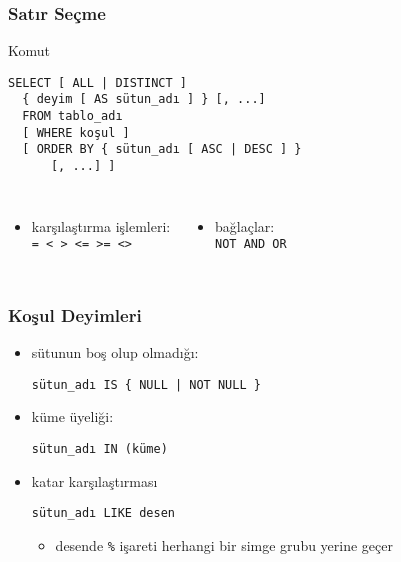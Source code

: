 \documentclass[dvipsnames]{beamer}
\theoremstyle{definition}
\theoremstyle{example}
\theoremstyle{plain}
\begin{document}
\begin{frame}[fragile]
  \frametitle{Satır Seçme}

  \begin{block}{Komut}
    \begin{lstlisting}
SELECT [ ALL | DISTINCT ]
  { deyim [ AS sütun_adı ] } [, ...]
  FROM tablo_adı
  [ WHERE koşul ]
  [ ORDER BY { sütun_adı [ ASC | DESC ] }
      [, ...] ]
    \end{lstlisting}
  \end{block}

  \pause
  \begin{columns}
    \begin{itemize}
      \item karşılaştırma işlemleri:\\
        \lstinline!= < > <= >= <>!
    \end{itemize}

    \begin{itemize}
      \item bağlaçlar:\\
        \lstinline!NOT AND OR!
    \end{itemize}
  \end{columns}
\end{frame}

\begin{frame}[fragile]
  \frametitle{Koşul Deyimleri}

  \begin{itemize}
    \item sütunun boş olup olmadığı:\\
    \begin{lstlisting}
sütun_adı IS { NULL | NOT NULL }
    \end{lstlisting}

    \pause
    \item küme üyeliği:\\
    \begin{lstlisting}
sütun_adı IN (küme)
    \end{lstlisting}

    \pause
    \item katar karşılaştırması
    \begin{lstlisting}
sütun_adı LIKE desen
    \end{lstlisting}
    \begin{itemize}
      \item desende \lstinline!%! işareti herhangi bir simge grubu yerine geçer
    \end{itemize}
  \end{itemize}
\end{frame}
\end{document}
